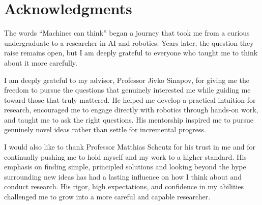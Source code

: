 \chapter*{Acknowledgments}




The words ``Machines can think'' began a journey that took me from a curious undergraduate to a researcher in AI and robotics. Years later, the question they raise remains open, but I am deeply grateful to everyone who taught me to think about it more carefully.

I am deeply grateful to my advisor, Professor Jivko Sinapov, for giving me the freedom to pursue the questions that genuinely interested me while guiding me toward those that truly mattered. He helped me develop a practical intuition for research, encouraged me to engage directly with robotics through hands-on work, and taught me to ask the right questions. His mentorship inspired me to pursue genuinely novel ideas rather than settle for incremental progress.

I would also like to thank Professor Matthias Scheutz for his trust in me and for continually pushing me to hold myself and my work to a higher standard. His emphasis on finding simple, principled solutions and looking beyond the hype surrounding new ideas has had a lasting influence on how I think about and conduct research. His rigor, high expectations, and confidence in my abilities challenged me to grow into a more careful and capable researcher.

